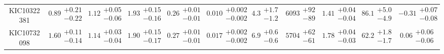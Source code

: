 \begin{tabular}{crrrrrrrrrr}
  KIC10322381 &  $0.89\substack{+0.21 \\ -0.22}$ &  $1.12\substack{+0.05 \\ -0.06}$ &  $1.93\substack{+0.15 \\ -0.16}$ &  $0.26\substack{+0.01 \\ -0.01}$ &  $0.010\substack{+0.002 \\ -0.002}$ &  $4.3\substack{+1.7 \\ -1.2}$ &  $6093\substack{+92 \\ -89}$ &  $1.41\substack{+0.04 \\ -0.04}$ &   $86.1\substack{+5.0 \\ -4.9}$ &          $-0.31\substack{+0.07 \\ -0.08}$ \\
  KIC10732098 &  $1.60\substack{+0.11 \\ -0.14}$ &  $1.14\substack{+0.03 \\ -0.04}$ &  $1.90\substack{+0.15 \\ -0.17}$ &  $0.27\substack{+0.01 \\ -0.01}$ &  $0.017\substack{+0.002 \\ -0.002}$ &  $6.9\substack{+0.6 \\ -0.6}$ &  $5704\substack{+62 \\ -61}$ &  $1.78\substack{+0.04 \\ -0.03}$ &   $62.2\substack{+1.8 \\ -1.7}$ &           $0.06\substack{+0.06 \\ -0.06}$ \\
\bottomrule
\end{tabular}
